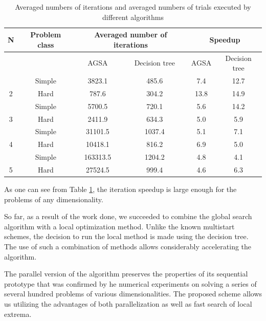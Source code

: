 \documentclass{svproc}
\begin{document}
\begin{table}[h!]
	\caption{Averaged numbers of iterations and averaged numbers of trials executed by different 
		algorithms}
	\label{tab:2}
	\centering
	\begin{tabular}{|c|c|c|c|c|c|}
		\hline
		
		N & Problem class & \multicolumn{2}{c|}{Averaged number of iterations} & \multicolumn{2}{c|}{Speedup} \\ \hline
		& ~ & AGSA & Decision tree & AGSA & Decision tree \\ \hline
		& Simple & 3823.1   & 485.6  & 7.4   & 12.7 \\ \hline
		2  & Hard & 787.6    & 304.2  & 13.8  & 14.9 \\ \hline
		& Simple & 5700.5   & 720.1  & 5.6   & 14.2  \\ \hline
		3  & Hard & 2411.9   & 634.3  & 5.0   & 5.9  \\ \hline
		& Simple & 31101.5  & 1037.4 & 5.1   & 7.1  \\ \hline
		4  & Hard & 10418.1  & 816.2  & 6.9   & 5.0  \\ \hline
		& Simple & 163313.5 & 1204.2 & 4.8   & 4.1 \\ \hline
		5  & Hard & 27524.5  & 999.4  & 4.6   & 6.3  \\ \hline
	\end{tabular}
\end{table}


As one can see from Table \ref{tab:2},  the iteration speedup is large enough for the problems of any  dimensionality. 

So far, as a result of the work done, we succeeded to combine the global search algorithm with a local  optimization method.  Unlike the known multistart schemes, the decision to run the local method is made using the decision  tree. The use of such a combination of methods allows considerably accelerating the algorithm. 

The parallel version of the algorithm preserves the properties of its sequential prototype that was  confirmed by he numerical experiments on solving a series of several hundred problems of various  dimensionalities. The proposed scheme allows us utilizing the advantages of both parallelization as well as fast search of local extrema.


%
%

{}
\end{document}
